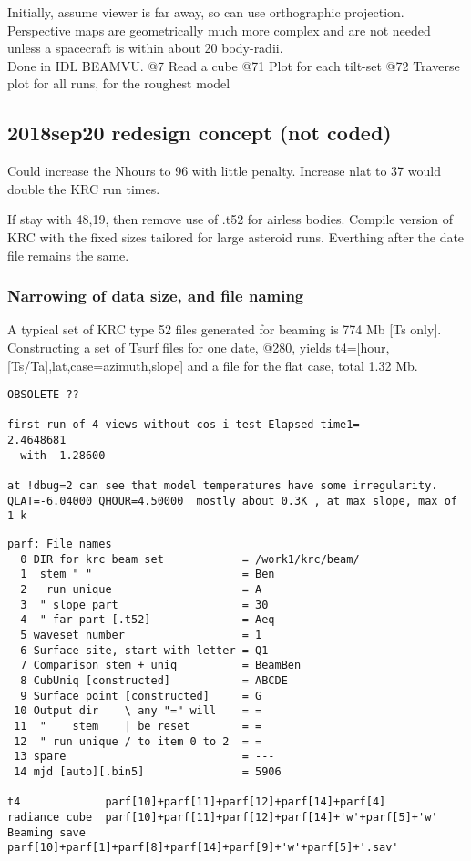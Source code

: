 \documentclass{article}
\begin{document}
Initially, assume viewer is far away, so can use orthographic
projection. Perspective maps are geometrically much more complex and are not
needed unless a spacecraft is within about 20 body-radii.
\\ Done in IDL BEAMVU. @7 Read a cube
\qi @71  Plot for each tilt-set
\qi @72 Traverse plot for all runs, for the roughest model


\subsection{2018sep20 redesign concept (not coded)}

 Could increase the Nhours to 96 with little penalty. Increase nlat to 37 would double the KRC run times.

If stay with 48,19, then remove use of .t52 for airless bodies. Compile version of KRC with the fixed sizes tailored for large asteroid runs. Everthing after the date file remains the same.

\subsubsection{Narrowing of data size, and file naming}
A typical set of KRC type 52 files generated for beaming is 774 Mb [Ts only].
Constructing a set of Tsurf files for one date, @280, yields
t4=[hour,[Ts/Ta],lat,case=azimuth,slope] and a file for the flat case, total
1.32 Mb.
 
\begin{verbatim}
OBSOLETE ??

first run of 4 views without cos i test Elapsed time1=        2.4648681
  with  1.28600

at !dbug=2 can see that model temperatures have some irregularity.
QLAT=-6.04000 QHOUR=4.50000  mostly about 0.3K , at max slope, max of 1 k
\end{verbatim}


\vspace{-3.mm} 
\begin{verbatim}
parf: File names
  0 DIR for krc beam set            = /work1/krc/beam/
  1  stem " "                       = Ben
  2   run unique                    = A
  3  " slope part                   = 30
  4  " far part [.t52]              = Aeq
  5 waveset number                  = 1
  6 Surface site, start with letter = Q1
  7 Comparison stem + uniq          = BeamBen
  8 CubUniq [constructed]           = ABCDE
  9 Surface point [constructed]     = G
 10 Output dir    \ any "=" will    = =
 11  "    stem    | be reset        = = 
 12  " run unique / to item 0 to 2  = = 
 13 spare                           = ---
 14 mjd [auto][.bin5]               = 5906

t4             parf[10]+parf[11]+parf[12]+parf[14]+parf[4]
radiance cube  parf[10]+parf[11]+parf[12]+parf[14]+'w'+parf[5]+'w'
Beaming save   parf[10]+parf[1]+parf[8]+parf[14]+parf[9]+'w'+parf[5]+'.sav'
\end{verbatim} 
  
\end{document}
